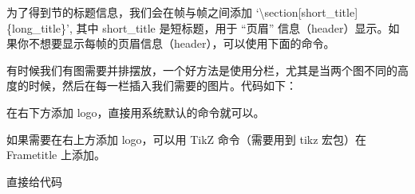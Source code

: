 为了得到节的标题信息，我们会在帧与帧之间添加
`\textbackslash{}section{[}short\_title{]}\{long\_title\}', 其中
short\_title 是短标题，用于 ``页眉''
信息（header）显示。如果你不想要显示每帧的页眉信息（header），可以使用下面的命令。

\begin{texinlist}
\end{texinlist}



有时候我们有图需要并排摆放，一个好方法是使用分栏，尤其是当两个图不同的高度的时候，然后在每一栏插入我们需要的图片。代码如下：

\begin{texinlist}
\end{texinlist}



在右下方添加 logo，直接用系统默认的命令就可以。

\begin{texinlist}
\end{texinlist}

如果需要在右上方添加 logo，可以用 TikZ 命令（需要用到 tikz 宏包）在
Frametitle 上添加。

\begin{texinlist}
\end{texinlist}



直接给代码

\begin{texinlist}
\newenvironment{question}
{\begin{frame}[environment=question,fragile]
 \begin{theorem}
}
{\end{theorem}
 \end{frame}
}
\end{texinlist}




